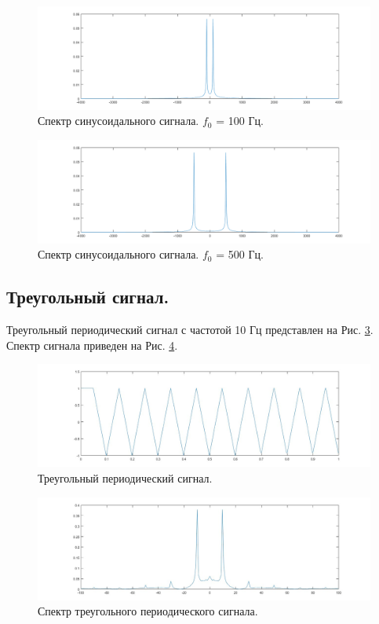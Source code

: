 \documentclass[a4paper,14pt]{extarticle}
\begin{document}
\begin{figure}[H]
\centering
\includegraphics[scale=0.5]{pics/sin100Hz_spec.png}
\caption{Спектр синусоидального сигнала. $f_0$ = 100 Гц.}
\label{sin100_}
\end{figure}
\begin{figure}[H]
\centering
\includegraphics[scale=0.5]{pics/sin500Hz_spec.png}
\caption{Спектр синусоидального сигнала. $f_0$ = 500 Гц.}
\label{sin500_}
\end{figure}

\subsection{Треугольный сигнал.}
Треугольный периодический сигнал с частотой 10 Гц представлен на Рис. \ref{treug}. Спектр сигнала приведен на Рис. \ref{treug_}.
\begin{figure}[H]
\centering
\includegraphics[scale=0.5]{pics/treug.jpg}
\caption{Треугольный периодический сигнал.}
\label{treug}
\end{figure}
\begin{figure}[H]
\centering
\includegraphics[scale=0.5]{pics/treug_spec.jpg}
\caption{Спектр треугольного периодического сигнала.}
\label{treug_}
\end{figure}
\end{document}
